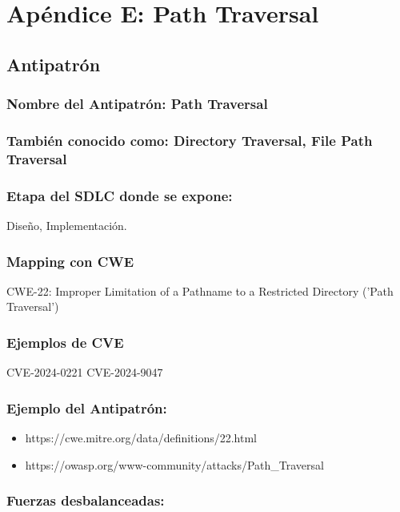 \chapter{Apéndice E: Path Traversal}

\section{Antipatrón}

\subsection{\textbf{Nombre del Antipatrón:} Path Traversal}

\subsection{\textbf{También conocido como:} Directory Traversal, File Path Traversal}

\subsection{\textbf{Etapa del SDLC donde se expone:}}

Diseño, Implementación.

\subsection{\textbf{Mapping con CWE}}
CWE-22: Improper Limitation of a Pathname to a Restricted Directory ('Path Traversal')

\subsection{\textbf{Ejemplos de CVE}}
CVE-2024-0221
CVE-2024-9047

\subsection{\textbf{Ejemplo del Antipatrón:} }

\begin{itemize}
    \item https://cwe.mitre.org/data/definitions/22.html
    \item https://owasp.org/www-community/attacks/Path\_Traversal
\end{itemize}

\subsection{\textbf{Fuerzas desbalanceadas:}}

